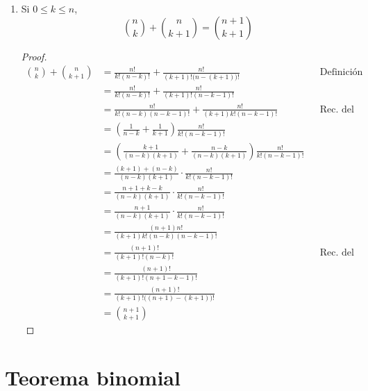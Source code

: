 \begin{enumerate}[label=\alph*)]
  \item Si $0\leq k \leq n$, \[\binom{n}{k} + \binom{n}{k+1} = \binom{n+1}{k+1}\]
  \begin{proof}\leavevmode
    \begin{align*}
      \binom{n}{k} + \binom{n}{k+1} &= \frac{n!}{k!(n-k)!} + \frac{n!}{(k+1)!\big(n-(k+1)\big)!} && \text{Definición}\\
      &= \frac{n!}{k!(n-k)!} + \frac{n!}{(k+1)!(n-k-1)!} \\ 
      &= \frac{n!}{k!(n-k)(n-k-1)!} + \frac{n!}{(k+1)k!(n-k-1)!}&& \text{Rec. del factorial} \\
      &= \left(\frac{1}{n-k} + \frac{1}{k+1}\right) \frac{n!}{k!(n-k-1)!}\\
      &= \left(\frac{k+1}{(n-k)(k+1)} + \frac{n-k}{(n-k)(k+1)}\right) \frac{n!}{k!(n-k-1)!} \\
      &= \frac{(k+1)+(n-k)}{(n-k)(k+1)} \cdot \frac{n!}{k!(n-k-1)!}\\
      &= \frac{n+1+k-k}{(n-k)(k+1)} \cdot \frac{n!}{k!(n-k-1)!} \\ 
      &= \frac{n+1}{(n-k)(k+1)} \cdot \frac{n!}{k!(n-k-1)!} \\ 
      &= \frac{(n+1)n!}{(k+1)k!(n-k)(n-k-1)!}\\
      &= \frac{(n+1)!}{(k+1)!(n-k)!} && \text{Rec. del factorial}\\
      &= \frac{(n+1)!}{(k+1)!(n+1-k-1)!}\\
      &= \frac{(n+1)!}{(k+1)!\big((n+1)-(k+1)\big)!}\\
      &= \binom{n+1}{k+1}
    \end{align*}
  \end{proof}
\end{enumerate}

\clearpage
\pagebreak

\section*{Teorema binomial}


